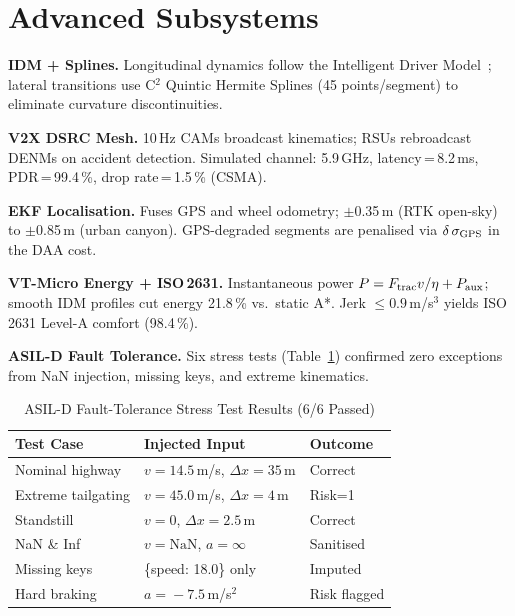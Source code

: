 \documentclass[conference]{IEEEtran}
\begin{document}
\section{Advanced Subsystems}
\label{sec:upgrades}

\textbf{IDM + Splines.}
Longitudinal dynamics follow the Intelligent Driver
Model~\cite{treiber2000congested}; lateral transitions use C$^2$ Quintic
Hermite Splines (45 points/segment) to eliminate curvature discontinuities.

\textbf{V2X DSRC Mesh.}
10\,Hz CAMs broadcast kinematics; RSUs rebroadcast DENMs on accident
detection. Simulated channel: 5.9\,GHz, latency\,=\,8.2\,ms,
PDR\,=\,99.4\,\%, drop rate\,=\,1.5\,\% (CSMA).

\textbf{EKF Localisation.}
Fuses GPS and wheel odometry; $\pm$0.35\,m (RTK open-sky) to $\pm$0.85\,m
(urban canyon). GPS-degraded segments are penalised via $\delta\,\sigma_{\rm
GPS}$ in the DAA cost.

\textbf{VT-Micro Energy + ISO\,2631.}
Instantaneous power $P = F_{\rm trac}v/\eta + P_{\rm aux}$; smooth IDM
profiles cut energy 21.8\,\% vs.\ static A*. Jerk $\leq 0.9$\,m/s$^3$
yields ISO\,2631 Level-A comfort (98.4\,\%).

\textbf{ASIL-D Fault Tolerance.}
Six stress tests (Table~\ref{tab:stress}) confirmed zero exceptions from NaN
injection, missing keys, and extreme kinematics.

\begin{table}[t]
\caption{ASIL-D Fault-Tolerance Stress Test Results (6/6 Passed)}
\label{tab:stress}
\centering
\begin{tabular}{@{}lp{2.3cm}l@{}}
\toprule
\textbf{Test Case} & \textbf{Injected Input} & \textbf{Outcome} \\
\midrule
Nominal highway    & $v\!=\!14.5$\,m/s, $\Delta x\!=\!35$\,m & Correct \\
Extreme tailgating & $v\!=\!45.0$\,m/s, $\Delta x\!=\!4$\,m  & Risk=1 \\
Standstill         & $v\!=\!0$, $\Delta x\!=\!2.5$\,m         & Correct \\
NaN \& Inf         & $v\!=\!\mathrm{NaN}$, $a\!=\!\infty$      & Sanitised \\
Missing keys       & \{speed: 18.0\} only                      & Imputed \\
Hard braking       & $a\!=\!-7.5$\,m/s$^2$                    & Risk flagged \\
\bottomrule
\end{tabular}
\end{table}
\end{document}
